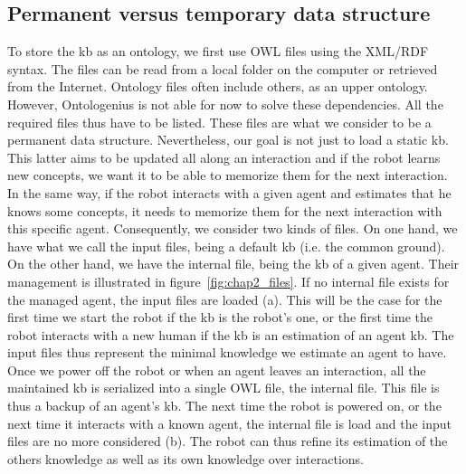 \subsection{Permanent versus temporary data structure}

To store the \acrlong{kb} as an ontology, we first use OWL files using the XML/RDF syntax. The files can be read from a local folder on the computer or retrieved from the Internet. Ontology files often include others, as an upper ontology. However, Ontologenius is not able for now to solve these dependencies. All the required files thus have to be listed. These files are what we consider to be a permanent data structure. Nevertheless, our goal is not just to load a static \acrlong{kb}. This latter aims to be updated all along an interaction and if the robot learns new concepts, we want it to be able to memorize them for the next interaction. In the same way, if the robot interacts with a given agent and estimates that he knows some concepts, it needs to memorize them for the next interaction with this specific agent. Consequently, we consider two kinds of files. On one hand, we have what we call the input files, being a default \acrlong{kb} (i.e. the common ground). On the other hand, we have the internal file, being the \acrlong{kb} of a given agent. Their management is illustrated in figure~\ref{fig:chap2_files}. If no internal file exists for the managed agent, the input files are loaded (a). This will be the case for the first time we start the robot if the \acrlong{kb} is the robot's one, or the first time the robot interacts with a new human if the \acrlong{kb} is an estimation of an agent \acrlong{kb}. The input files thus represent the minimal knowledge we estimate an agent to have. Once we power off the robot or when an agent leaves an interaction, all the maintained \acrlong{kb} is serialized into a single OWL file, the internal file. This file is thus a backup of an agent's \acrlong{kb}. The next time the robot is powered on, or the next time it interacts with a known agent, the internal file is load and the input files are no more considered (b). The robot can thus refine its estimation of the others knowledge as well as its own knowledge over interactions.

